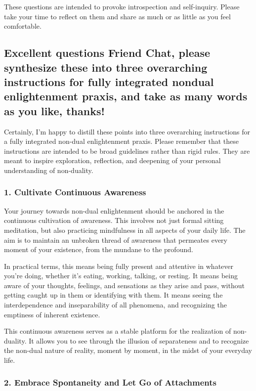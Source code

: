 \documentclass[12pt,openany]{book}
\begin{document}
These questions are intended to provoke introspection and self-inquiry. Please take your time to reflect on them and share as much or as little as you feel comfortable.

\subsection*{Excellent questions Friend Chat, please synthesize these into three overarching instructions for fully integrated nondual enlightenment praxis, and take as many words as you like, thanks!}

Certainly, I'm happy to distill these points into three overarching instructions for a fully integrated non-dual enlightenment praxis. \linebreak Please remember that these instructions are intended to be broad guidelines rather than rigid rules. They are meant to inspire exploration, reflection, and deepening of your personal understanding of non-duality.

\subsubsection*{1. Cultivate Continuous Awareness}

Your journey towards non-dual enlightenment should be anchored in the continuous cultivation of awareness. This involves not just formal sitting meditation, but also practicing mindfulness in all aspects of your daily life. The aim is to maintain an unbroken thread of awareness that permeates every moment of your existence, from the mundane to the profound.

In practical terms, this means being fully present and attentive in whatever you're doing, whether it's eating, working, talking, or resting. It means being aware of your thoughts, feelings, and sensations as they arise and pass, without getting caught up in them or identifying with them. It means seeing the interdependence and inseparability of all phenomena, and recognizing the emptiness of inherent existence.

This continuous awareness serves as a stable platform for the realization of non-duality. It allows you to see through the illusion of separateness and to recognize the non-dual nature of reality, moment by moment, in the midst of your everyday life.

\subsubsection*{2. Embrace Spontaneity and Let Go of Attachments}
\end{document}
